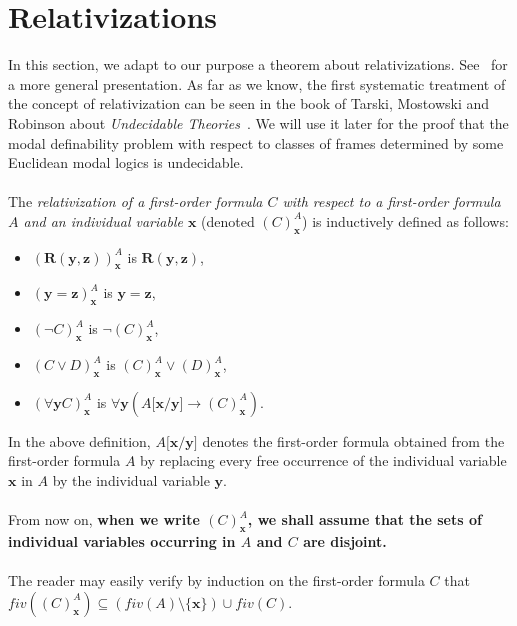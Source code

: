 \documentclass[draft]{article}
\begin{document}
\section{Relativizations}\label{section:about:relativization}
%
%
In this section, we adapt to our purpose a theorem about relativizations.
See~\cite[Theorem $5.1.1$ at Page~$203$]{Hodges:1993} for a more general presentation.
As far as we know, the first systematic treatment of the concept of relativization can be seen in the book of Tarski, Mostowski and Robinson about {\it Undecidable Theories}\/~\cite{Tarski:Mostowski:Robinson:1953}.
We will use it later for the proof that the modal definability problem with respect to classes of frames determined by some Euclidean modal logics is undecidable.
%
%
\\
\\
%
%
The {\it relativization of a first-order formula $C$ with respect to a first-order formula $A$ and an individual variable $\mathbf{x}$}\/ (denoted $(C)_{\mathbf{x}}^{A}$) is inductively defined as follows:
%
%
\begin{itemize}
%
%
\item $(\mathbf{R}(\mathbf{y},\mathbf{z}))_{\mathbf{x}}^{A}$ is $\mathbf{R}(\mathbf{y},\mathbf{z})$,
%
%
\item $(\mathbf{y}=\mathbf{z})_{\mathbf{x}}^{A}$ is $\mathbf{y}=\mathbf{z}$,
%
%
\item $(\neg C)_{\mathbf{x}}^{A}$ is $\neg(C)_{\mathbf{x}}^{A}$,
%
%
\item $(C\vee D)_{\mathbf{x}}^{A}$ is $(C)_{\mathbf{x}}^{A}\vee(D)_{\mathbf{x}}^{A}$,
%
%
\item $(\forall\mathbf{y}C)_{\mathbf{x}}^{A}$ is $\forall\mathbf{y}(A\lbrack\mathbf{x}/\mathbf{y}\rbrack\rightarrow(C)_{\mathbf{x}}^{A})$.
%
%
\end{itemize}
%
%
In the above definition, $A\lbrack\mathbf{x}/\mathbf{y}\rbrack$ denotes the first-order formula obtained from the first-order formula $A$ by replacing every free occurrence of the individual variable $\mathbf{x}$ in $A$ by the individual variable $\mathbf{y}$.
%
%
\\
\\
%
%
From now on, {\bf when we write $(C)_{\mathbf{x}}^{A}$, we shall assume that the sets of individual variables occurring in $A$ and $C$ are disjoint.}
%
%
\\
\\
%
%
The reader may easily verify by induction on the first-order formula $C$ that $fiv((C)_{\mathbf{x}}^{A})\subseteq(fiv(A)\setminus\{\mathbf{x}\}){\cup}fiv(C)$.
\end{document}
